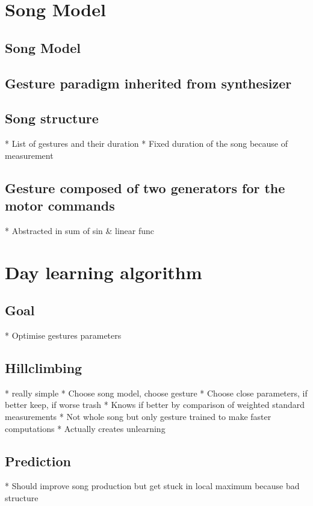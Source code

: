 \documentclass{report}
\begin{document}
\section{Song Model}\label{song-model}

\subsection{Song Model}\label{song-model-1}

\subsection{Gesture paradigm inherited from
synthesizer}\label{gesture-paradigm-inherited-from-synthesizer}

\subsection{Song structure}\label{song-structure}

  * List of gestures and their duration
  * Fixed duration of the song because of measurement
\subsection{Gesture composed of two generators for the motor
commands}\label{gesture-composed-of-two-generators-for-the-motor-commands}

  * Abstracted in sum of sin \& linear func
\section{Day learning algorithm}\label{day-learning-algorithm}

\subsection{Goal}\label{goal}
  * Optimise gestures parameters
\subsection{Hillclimbing}\label{hillclimbing}

  * really simple
  * Choose song model, choose gesture
  * Choose close parameters, if better keep, if worse trash
  * Knows if better by comparison of weighted standard measurements
  * Not whole song but only gesture trained to make faster computations
        * Actually creates unlearning

  \subsection{Prediction}\label{prediction}
  * Should improve song production but get stuck in local maximum because
  bad structure
\end{document}
